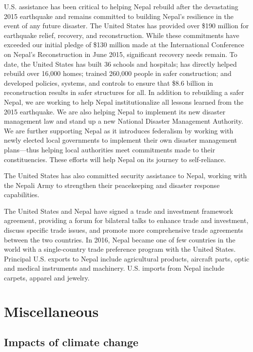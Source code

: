 \documentclass[
  openany]{book}
\begin{document}
U.S. assistance has been critical to helping Nepal rebuild after the devastating 2015 earthquake and remains committed to building Nepal's resilience in the event of any future disaster. The United States has provided over \$190 million for earthquake relief, recovery, and reconstruction. While these commitments have exceeded our initial pledge of \$130 million made at the International Conference on Nepal's Reconstruction in June 2015, significant recovery needs remain. To date, the United States has built 36 schools and hospitals; has directly helped rebuild over 16,000 homes; trained 260,000 people in safer construction; and developed policies, systems, and controls to ensure that \$8.6 billion in reconstruction results in safer structures for all. In addition to rebuilding a safer Nepal, we are working to help Nepal institutionalize all lessons learned from the 2015 earthquake. We are also helping Nepal to implement its new disaster management law and stand up a new National Disaster Management Authority. We are further supporting Nepal as it introduces federalism by working with newly elected local governments to implement their own disaster management plans---thus helping local authorities meet commitments made to their constituencies. These efforts will help Nepal on its journey to self-reliance.

The United States has also committed security assistance to Nepal, working with the Nepali Army to strengthen their peacekeeping and disaster response capabilities.

The United States and Nepal have signed a trade and investment framework agreement, providing a forum for bilateral talks to enhance trade and investment, discuss specific trade issues, and promote more comprehensive trade agreements between the two countries. In 2016, Nepal became one of few countries in the world with a single-country trade preference program with the United States. Principal U.S. exports to Nepal include agricultural products, aircraft parts, optic and medical instruments and machinery. U.S. imports from Nepal include carpets, apparel and jewelry.

\hypertarget{miscellaneous}{%
\section{Miscellaneous}\label{miscellaneous}}

\hypertarget{impacts-of-climate-change}{%
\subsection{Impacts of climate change}\label{impacts-of-climate-change}}
\end{document}
